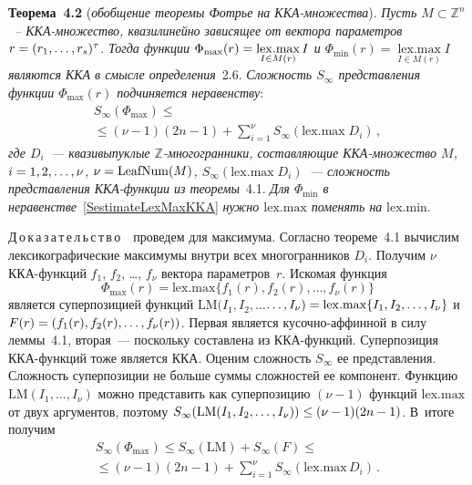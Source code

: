 \begin{multicols}{2}
\noindent
\textbf{Теорема~4.2}
(\textit{обобщение теоремы Фотрье на ККА-мно\-же\-ст\-ва}). \textit{Пусть
$M\subset\mathbb{Z}^n$~-- ККА-мно\-же\-ст\-во, квазилинейно зависящее от
вектора параметров $r\hm=(r_1,\ldots,r_s)^\tau$. Тогда функции
$\Phi_{\max}(r)\hm=\mathop{\mathrm{lex.max}}\limits_{I\in M(r)}I$ и
$\Phi_{\min}(r)=\mathop{\mathrm{lex.max}}\limits_{I\in M(r)}I$ являются
ККА в смысле определения}~2.6. \textit{Сложность
$S_\infty$ представления функции $\Phi_{\max}(r)$ подчиняется
неравенству}:
\begin{multline}
S_\infty(\Phi_{\max})\leq{}\\
{}\leq (\nu-1)(2n-1) + \sum\limits_{i=1}^\nu S_\infty(\mathrm{lex.max}\;D_i)\,, \label{SestimateLexMaxKKA}
\end{multline}
\textit{где $D_i$~--- квазивыпуклые $\mathbb{Z}$-многогранники, со\-став\-ля\-ющие
ККА-мно\-жест\-во $M$, $i\hm=1,2,\ldots,\nu$, $\nu\hm=\mathrm{LeafNum}(M)$,
$S_\infty(\mathrm{lex.max}\;D_i)$~--- слож\-ность пред\-став\-ле\-ния
ККА-функции из теоремы}~4.1. \textit{Для $\Phi_{\min}$ в неравенстве}~\eqref{SestimateLexMaxKKA} 
\textit{нужно $\mathrm{lex.max}$ поменять на}
$\mathrm{lex.min}$. 

\medskip

\noindent
Д\,о\,к\,а\,з\,а\,т\,е\,л\,ь\,с\,т\,в\,о\ \ проведем для максимума. Согласно теореме~4.1
вычислим лексикографические максимумы внутри всех многогранников
$D_i$. Получим $\nu$ ККА-функ\-ций $f_1$, $f_2$, \dots, $f_\nu$
вектора параметров~$r$. Искомая функция
$$
\Phi_{\max}(r) = \mathrm{lex.max}\{f_1(r),f_2(r),\ldots,f_\nu(r)\}$$
является суперпозицией функций $\mathrm{LM}(I_1,I_2,\ldots$\linebreak $\ldots,I_\nu)\hm=
\mathrm{lex.max}\{I_1,I_2,\ldots,I_\nu\}$ и 
$F(r) \hm= \left (f_1(r),f_2(r),\ldots,f_\nu(r)\right)$. 
Первая является ку\-соч\-но-аф\-фин\-ной в силу леммы~4.1, 
вторая~--- поскольку составлена из ККА-функ\-ций. Суперпозиция ККА-функций тоже является 
ККА. Оценим сложность $S_\infty$ ее пред\-став\-ле\-ния. Слож\-ность 
суперпозиции не больше суммы сложностей ее компонент. Функцию $\mathrm{LM}(I_1,\ldots,I_\nu)$ 
можно представить как суперпозицию $(\nu-1)$ функций $\mathrm{lex.max}$ от двух аргументов, 
поэтому $S_\infty(\mathrm{LM}(I_1,I_2,\ldots,I_\nu))\hm\leq (\nu-1)(2n-1)$. В~итоге получим
\begin{multline*}
S_\infty(\Phi_{\max})\leq S_\infty(\mathrm{LM}) + S_\infty(F) \leq{}\\
{}\leq (\nu-1)(2n-1) 
+ \sum\limits_{i=1}^\nu S_\infty(\mathrm{lex.max}\,D_i)\,.
\end{multline*}



\end{multicols}
